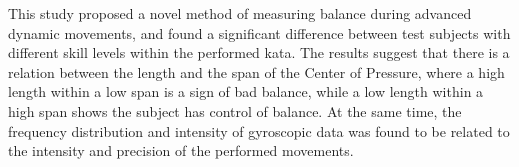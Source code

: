 



This study proposed a novel method of measuring balance during advanced dynamic movements, and found a significant difference between test subjects with different skill levels within the performed kata. The results suggest that there is a relation between the length and the span of the Center of Pressure, where a high length within a low span is a sign of bad balance, while a low length within a high span shows the subject has control of balance. At the same time, the frequency distribution and intensity of gyroscopic data was found to be related to the intensity and precision of the performed movements.
